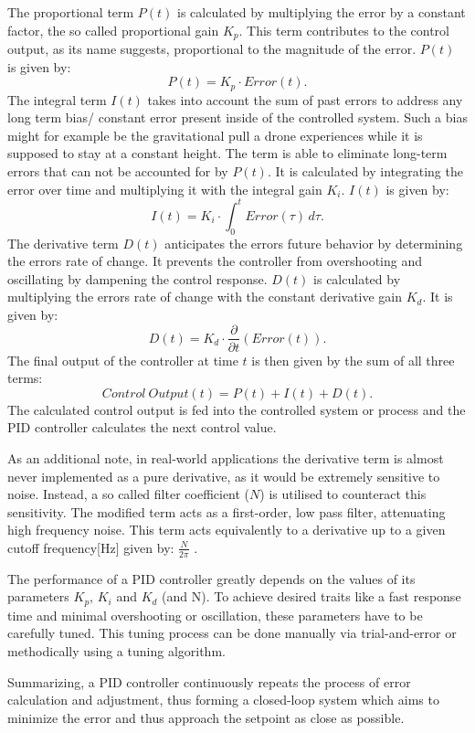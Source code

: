 The proportional term $P(t)$ is calculated by multiplying the error by a constant factor, the so called proportional gain $K_p$.
This term contributes to the control output, as its name suggests, proportional to the magnitude of the error.
$P(t)$ is given by:
\[
	P(t) = K_p \cdot Error(t)
.\]
The integral term $I(t)$ takes into account the sum of past errors to address any long term bias/ constant error present inside of the controlled system.
Such a bias might for example be the gravitational pull a drone experiences while it is supposed to stay at a constant height.
The term is able to eliminate long-term errors that can not be accounted for by $P(t)$.
It is calculated by integrating the error over time and multiplying it with the integral gain $K_i$.
$I(t)$ is given by:
\[
	I(t) = K_i \cdot \int_{0}^{t} Error(\tau) \,d\tau
.\]
The derivative term $D(t)$ anticipates the errors future behavior by determining the errors rate of change.
It prevents the controller from overshooting and oscillating by dampening the control response.
$D(t)$ is calculated by multiplying the errors rate of change with the constant derivative gain $K_d$.
It is given by:
\[
	D(t) = K_d \cdot \frac{\partial}{\partial t}(Error(t))
.\]
The final output of the controller at time $t$ is then given by the sum of all three terms:
\[
	Control\ Output(t) = P(t) + I(t) + D(t)
.\]
The calculated control output is fed into the controlled system or process and the PID controller calculates the next control value.

As an additional note, in real-world applications the derivative term is almost never implemented as a pure derivative, as it would be extremely sensitive to noise.
Instead, a so called filter coefficient ($N$) is utilised to counteract this sensitivity.
The modified term acts as a first-order, low pass filter, attenuating high frequency noise.
This term acts equivalently to a derivative up to a given cutoff frequency[Hz] given by: $\frac{N}{2\pi}$ .

The performance of a PID controller greatly depends on the values of its parameters $K_p$, $K_i$ and $K_d$ (and N).
To achieve desired traits like a fast response time and minimal overshooting or oscillation, these parameters have to be carefully tuned. 
This tuning process can be done manually via trial-and-error or methodically using a tuning algorithm.

Summarizing, a PID controller continuously repeats the process of error calculation and adjustment, thus forming a closed-loop system which aims to minimize the error and thus approach the setpoint as close as possible.

